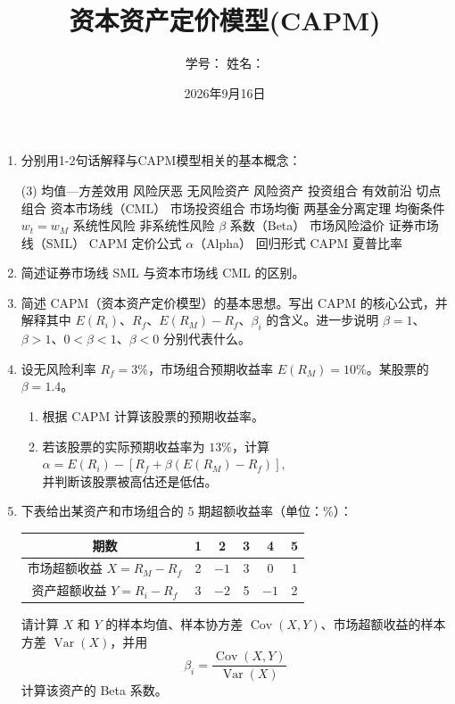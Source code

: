 \documentclass{article}
\author{学号：\underline{\hspace{4cm}} 姓名：\underline{\hspace{4cm}} }
\title{资本资产定价模型(CAPM)}
\date{2026年9月16日}
\begin{document}
\maketitle

\begin{enumerate}[label=\textbf{\arabic*.}]

\item 分别用1-2句话解释与CAPM模型相关的基本概念：

\begin{tasks}[label=(\arabic*), label-width=2em](3)
\task 均值—方差效用
\task 风险厌恶
\task 无风险资产
\task 风险资产
\task 投资组合
\task 有效前沿
\task 切点组合%
\task 资本市场线（CML）
\task 市场投资组合%
\task 市场均衡
\task 两基金分离定理
\task 均衡条件 \(w_t=w_M\)
\task 系统性风险
\task 非系统性风险
\task \(\beta\) 系数（Beta）
\task 市场风险溢价
\task 证券市场线（SML）
\task CAPM 定价公式
\task \(\alpha\)（Alpha）
\task 回归形式 CAPM
\task 夏普比率
\end{tasks}

\item 简述证券市场线 SML 与资本市场线 CML 的区别。

\item 简述 CAPM（资本资产定价模型）的基本思想。写出 CAPM 的核心公式，并解释其中 \(E(R_i)\)、\(R_f\)、\(E(R_M)-R_f\)、\(\beta_i\) 的含义。进一步说明 \(\beta=1\)、\(\beta>1\)、\(0<\beta<1\)、\(\beta<0\) 分别代表什么。

\item 设无风险利率 \(R_f=3\%\)，市场组合预期收益率 \(E(R_M)=10\%\)。某股票的 \(\beta=1.4\)。
\begin{enumerate}[label=(\alph*)]
\item 根据 CAPM 计算该股票的预期收益率。
\item 若该股票的实际预期收益率为 \(13\%\)，计算
\(
\alpha=E(R_i)-[R_f+\beta(E(R_M)-R_f)],
\) \\ 
并判断该股票被高估还是低估。
\end{enumerate}

\item 下表给出某资产和市场组合的 5 期超额收益率（单位：\%）：
\begin{center}
\begin{tabular}{c|ccccc}
期数 & 1 & 2 & 3 & 4 & 5  \\
\hline
市场超额收益 \(X=R_M-R_f\) & 2 & \(-1\) & 3 & 0 & 1 \\
资产超额收益 \(Y=R_i-R_f\) & 3 & \(-2\) & 5 & \(-1\) & 2 \\
\end{tabular}
\end{center}
请计算 \(X\) 和 \(Y\) 的样本均值、样本协方差 \(\operatorname{Cov}(X,Y)\)、市场超额收益的样本方差 \(\operatorname{Var}(X)\)，并用
\[
\beta_i=\frac{\operatorname{Cov}(X,Y)}{\operatorname{Var}(X)}
\]
计算该资产的 Beta 系数。


\end{enumerate}
\end{document}

